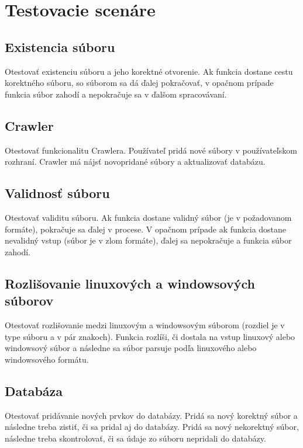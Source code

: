 \documentclass[12pt,a4paper, draft]{article}
\begin{document}
\section*{Testovacie scenáre}
\subsection*{Existencia súboru}
Otestovať existenciu súboru a jeho korektné otvorenie. Ak funkcia dosta\-ne cestu korektného súboru, so súborom sa dá ďalej pokračovať, v opačnom prípade funkcia súbor zahodí a nepokračuje sa v ďalšom spracovávaní.

\subsection*{Crawler}
Otestovať funkcionalitu Crawlera. Používateľ pridá nové súbory v používateľskom rozhraní. Crawler má nájsť novopridané súbory a aktualizovať databázu. 

\subsection*{Validnosť súboru}
Otestovať validitu súboru. Ak funkcia dostane validný súbor (je v požado\-vanom formáte), pokračuje sa ďalej v procese. V opačnom prípade ak funkcia dostane nevalidný vstup (súbor je v zlom formáte), ďalej sa nepokračuje a funkcia súbor zahodí.

\subsection*{Rozlišovanie linuxových a windowsových súborov}
Otestovať rozlišovanie medzi linuxovým a windowsovým súborom (rozdiel je v type súboru a v pár znakoch). Funkcia rozlíši, či dostala na vstup linu\-xový alebo windowsový súbor a následne sa súbor parsuje podľa linuxového alebo windowsového formátu.  

\subsection*{Databáza}
Otestovať pridávanie nových prvkov do databázy. Pridá sa nový korektný súbor a následne treba zistiť, či sa pridal aj do databázy. Pridá sa nový nekorektný súbor, následne treba skontrolovať, či sa údaje zo súboru nepridali do databázy.
\end{document}
